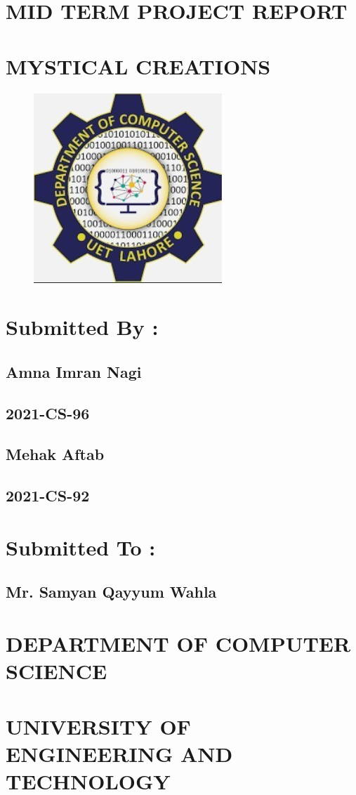\documentclass[12pt]{article}
\begin{document}
\thispagestyle{empty}
	\begin{center}
	    \section*{MID TERM PROJECT REPORT} 
	    \section*{MYSTICAL CREATIONS} \hfill
	    \begin{figure}[!ht]
	            \begin{center}
	                \includegraphics{Logo}
	            \end{center}
        \end{figure}  
	    \section*{Submitted By :}
	        \subsection*{Amna Imran Nagi}
	        \subsection*{2021-CS-96}
	        \subsection*{Mehak Aftab}
	        \subsection*{2021-CS-92} \hfill
	    \section*{Submitted To :}
	        \subsection*{Mr. Samyan Qayyum Wahla} \hfill \break
	    \section*{DEPARTMENT OF COMPUTER SCIENCE}
	    \section*{UNIVERSITY OF ENGINEERING AND TECHNOLOGY}
	    \newpage
	\end{center}
\end{document}
